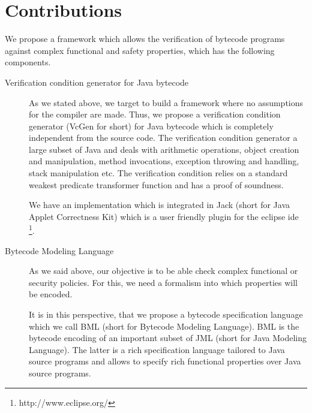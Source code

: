    \section{Contributions}
We propose a framework which allows the verification of bytecode programs against complex functional and safety properties, which has the following 
components.
\begin{description}
   \item [Verification condition generator for Java bytecode]
         As we stated above, we target to build a framework where no assumptions for the compiler are made.
	 Thus, we propose a verification condition generator (VcGen for short) for Java bytecode which is completely independent from 
	 the source code. The verification condition generator a large subset of Java and deals with
	 arithmetic operations, object creation and manipulation,
	 method invocations, exception throwing and handling, stack manipulation etc.
	 The verification condition relies on a standard weakest predicate transformer function
	 and  has a proof of soundness.
	 
	 We have an implementation which is integrated in Jack (short for Java Applet Correctness Kit) \cite{BRL-JACK} which is a user friendly 
	 plugin for the eclipse ide \footnote{http://www.eclipse.org/}. 
	 
   \item [Bytecode Modeling Language] 
         

         As we said above, our objective is to be able  check complex functional or security policies.
	 For this, we need a formalism into which properties will be encoded. 

	 It is in this perspective, that we propose  a bytecode specification language which we call BML (short for Bytecode Modeling Language). 
	 BML is the bytecode encoding of an important subset of  JML (short for Java Modeling Language). The latter is a rich specification
	 language tailored to Java source programs and
	 allows to specify rich functional properties over Java source programs.


\end{description}
